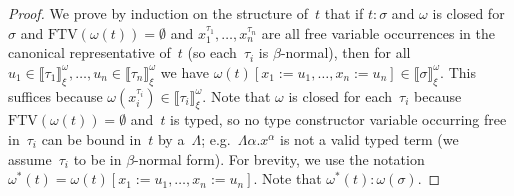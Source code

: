 \documentclass[runningheads,a4paper]{llncs}
\newcommand{\subst}[2]{#1:=#2}
\newcommand{\FTV}{\mathrm{FTV}}
\newcommand{\val}[3]{\ensuremath{\llbracket#1\rrbracket_{#2}^{#3}}}
\begin{document}
\begin{proof}
  We prove by induction on the structure of~$t$ that if $t : \sigma$
  and $\omega$ is closed for~$\sigma$ and $\FTV(\omega(t)) =
  \emptyset$ and $x_1^{\tau_1},\ldots,x_n^{\tau_n}$ are all free
  variable occurrences in the canonical representative of~$t$ (so
  each~$\tau_i$ is $\beta$-normal), then for all
  $u_1\in\val{\tau_1}{\xi}{\omega},\ldots,u_n\in\val{\tau_n}{\xi}{\omega}$
  we have $\omega(t)[\subst{x_1}{u_1},\ldots,\subst{x_n}{u_n}] \in
  \val{\sigma}{\xi}{\omega}$. This suffices because
  $\omega(x_i^{\tau_i}) \in \val{\tau_i}{\xi}{\omega}$. Note that
  $\omega$ is closed for each~$\tau_i$ because $\FTV(\omega(t)) =
  \emptyset$ and~$t$ is typed, so no type constructor variable
  occurring free in~$\tau_i$ can be bound in~$t$ by a~$\Lambda$;
  e.g.~$\Lambda \alpha . x^\alpha$ is not a valid typed term (we
  assume~$\tau_i$ to be in $\beta$-normal form). For brevity, we use
  the notation $\omega^*(t) =
  \omega(t)[\subst{x_1}{u_1},\ldots,\subst{x_n}{u_n}]$. Note that
  $\omega^*(t) : \omega(\sigma)$.


\end{proof}
\end{document}
